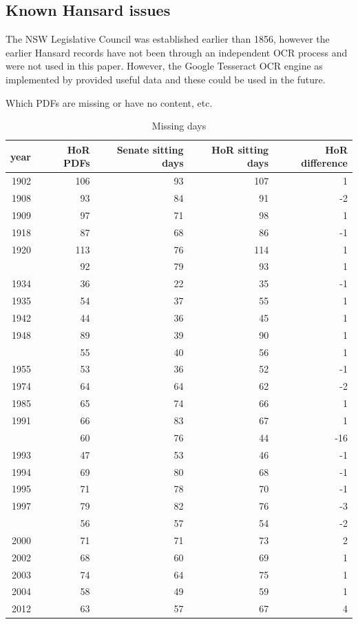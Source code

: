 \documentclass[12pt,]{article}
\theoremstyle{definition}
\theoremstyle{definition}
\theoremstyle{definition}
\theoremstyle{remark}
\begin{document}
\subsection{Known Hansard issues}\label{knownhansardissues}

The NSW Legislative Council was established earlier than 1856, however
the earlier Hansard records have not been through an independent OCR
process and were not used in this paper. However, the Google Tesseract
OCR engine as implemented by \citet{Ooms2018tesseract} provided useful
data and these could be used in the future.

Which PDFs are missing or have no content, etc.

\begin{table}

\caption{\label{tab:missingdays}Missing days}
\centering
\fontsize{12}{14}\selectfont
\begin{tabular}[t]{rrrrr}
\toprule
year & HoR PDFs                      & Senate sitting days           & HoR sitting days              & HoR difference\\
\midrule
1902 & 106 & 93 & 107 & 1\\
1908 & 93 & 84 & 91 & -2\\
1909 & 97 & 71 & 98 & 1\\
1918 & 87 & 68 & 86 & -1\\
1920 & 113 & 76 & 114 & 1\\
\addlinespace
1921 & 92 & 79 & 93 & 1\\
1934 & 36 & 22 & 35 & -1\\
1935 & 54 & 37 & 55 & 1\\
1942 & 44 & 36 & 45 & 1\\
1948 & 89 & 39 & 90 & 1\\
\addlinespace
1951 & 55 & 40 & 56 & 1\\
1955 & 53 & 36 & 52 & -1\\
1974 & 64 & 64 & 62 & -2\\
1985 & 65 & 74 & 66 & 1\\
1991 & 66 & 83 & 67 & 1\\
\addlinespace
1992 & 60 & 76 & 44 & -16\\
1993 & 47 & 53 & 46 & -1\\
1994 & 69 & 80 & 68 & -1\\
1995 & 71 & 78 & 70 & -1\\
1997 & 79 & 82 & 76 & -3\\
\addlinespace
1998 & 56 & 57 & 54 & -2\\
2000 & 71 & 71 & 73 & 2\\
2002 & 68 & 60 & 69 & 1\\
2003 & 74 & 64 & 75 & 1\\
2004 & 58 & 49 & 59 & 1\\
2012 & 63 & 57 & 67 & 4\\
\bottomrule
\end{tabular}
\end{table}
\end{document}
